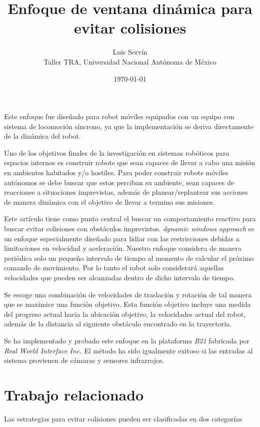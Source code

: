 \documentclass[12pt]{article}
\title{\vspace{-4ex}\textbf{Enfoque de ventana dinámica para evitar colisiones}\vspace{-2ex}}
\date{\today}
\author{Luis Servín\\ Taller TRA, Universidad Nacional Autónoma de México}
\begin{document}
\maketitle

Este enfoque fue diseñado para robot móviles equipados con un equipo con sistema de locomoción síncrono, ya que la implementación se deriva directamente de la dinámica del robot.

Uno de los objetivos finales de la investigación en sistemas robóticos para espacios internos es construir robots que sean capaces de llevar a cabo una misión en ambientes habitados y/o hostiles. Para poder construir robots móviles autónomos se debe buscar que estos perciban su ambiente, sean capaces de reacciones a situaciones imprevistas, además de planear/replantear sus acciones de manera dinámica con el objetivo de llevar a termino sus misiones.

Este artículo tiene como punto central el buscar un comportamiento reactivo para buscar evitar colisiones con obstáculos imprevistos. \emph{dynamic windows approach} es un enfoque especialmente diseñado para lidiar con las restricciones debidas a limitaciones en velocidad y aceleración. Nuestro enfoque considera de manera periódica solo un pequeño intervalo de tiempo al momento de calcular el próximo comando de movimiento. Por lo tanto el robot solo considerará aquellas velocidades que pueden ser alcanzadas dentro de dicho intervalo de tiempo.

Se escoge una combinación de velocidades de traslación y rotación de tal manera que se maximice una función objetivo. Esta función objetivo incluye una medida del progreso actual hacia la ubicación objetivo, la velocidades actual del robot, además de la distancia al siguiente obstáculo encontrado en la trayectoria.

Se ha implementado y probado este enfoque en la plataforma \emph{B21} fabricada por \emph{Real World Interface Inc.} El método ha sido igualmente exitoso si las entradas al sistema provienen de cámaras y sensores infrarrojos.

\section{Trabajo relacionado}

Las estrategias para evitar colisiones pueden ser clasificadas en dos categorías
\end{document}
